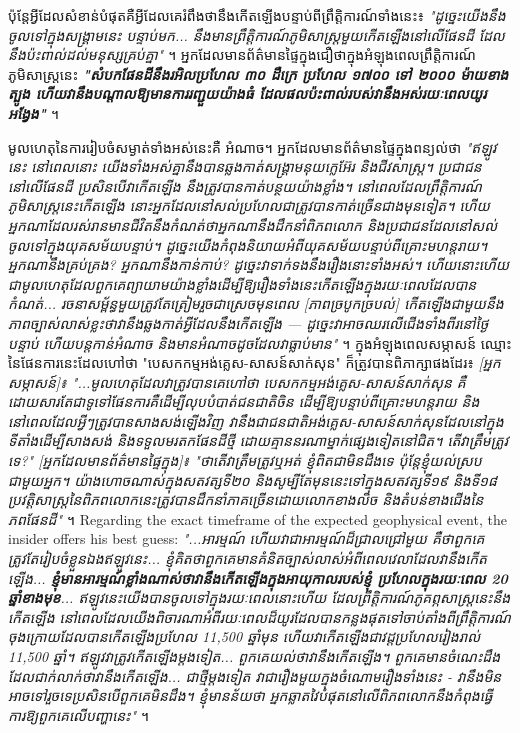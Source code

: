 \documentclass[10pt,twocolumn,letterpaper]{article}
\begin{document}
ប៉ុន្តែអ្វីដែលសំខាន់បំផុតគឺអ្វីដែលគេរំពឹងថានឹងកើតឡើងបន្ទាប់ពីព្រឹត្តិការណ៍ទាំងនេះ៖ \textit{"ដូច្នេះយើងនឹងចូលទៅក្នុងសង្គ្រាមនេះ បន្ទាប់មក... នឹងមានព្រឹត្តិការណ៍ភូមិសាស្ត្រមួយកើតឡើងនៅលើផែនដី ដែលនឹងប៉ះពាល់ដល់មនុស្សគ្រប់គ្នា"} \cite{4}។ អ្នកដែលមានព័ត៌មានផ្ទៃក្នុងជឿថាក្នុងអំឡុងពេលព្រឹត្តិការណ៍ភូមិសាស្ត្រនេះ \textit{\textbf{"សំបកផែនដីនឹងរអិលប្រហែល ៣០ ដឺក្រេ ប្រហែល ១៧០០ ទៅ ២០០០ ម៉ាយខាងត្បូង ហើយវានឹងបណ្តាលឱ្យមានការរញ្ជួយយ៉ាងធំ ដែលផលប៉ះពាល់របស់វានឹងអស់រយៈពេលយូរអង្វែង"  }} \cite{4}។

មូលហេតុនៃការរៀបចំសម្ងាត់ទាំងអស់នេះគឺ អំណាច។ អ្នកដែលមានព័ត៌មានផ្ទៃក្នុងពន្យល់ថា \textit{"ឥឡូវនេះ នៅពេលនោះ យើងទាំងអស់គ្នានឹងបានឆ្លងកាត់សង្គ្រាមនុយក្លេអ៊ែរ និងជីវសាស្ត្រ។ ប្រជាជននៅលើផែនដី ប្រសិនបើវាកើតឡើង នឹងត្រូវបានកាត់បន្ថយយ៉ាងខ្លាំង។ នៅពេលដែលព្រឹត្តិការណ៍ភូមិសាស្ត្រនេះកើតឡើង នោះអ្នកដែលនៅសល់ប្រហែលជាត្រូវបានកាត់ច្រើនជាងមុនទៀត។ ហើយអ្នកណាដែលរស់រានមានជីវិតនឹងកំណត់ថាអ្នកណានឹងដឹកនាំពិភពលោក និងប្រជាជនដែលនៅសល់ចូលទៅក្នុងយុគសម័យបន្ទាប់។ ដូច្នេះយើងកំពុងនិយាយអំពីយុគសម័យបន្ទាប់ពីគ្រោះមហន្តរាយ។ អ្នកណានឹងគ្រប់គ្រង? អ្នកណានឹងកាន់កាប់? ដូច្នេះវាទាក់ទងនឹងរឿងនោះទាំងអស់។ ហើយនោះហើយជាមូលហេតុដែលពួកគេព្យាយាមយ៉ាងខ្លាំងដើម្បីឱ្យរឿងទាំងនេះកើតឡើងក្នុងរយៈពេលដែលបានកំណត់... រចនាសម្ព័ន្ធមួយត្រូវតែត្រៀមរួចជាស្រេចមុនពេល [ភាពច្របូកច្របល់] កើតឡើងជាមួយនឹងភាពច្បាស់លាស់ខ្លះថាវានឹងឆ្លងកាត់អ្វីដែលនឹងកើតឡើង — ដូច្នេះវាអាចឈរលើជើងទាំងពីរនៅថ្ងៃបន្ទាប់ ហើយបន្តកាន់អំណាច និងមានអំណាចដូចដែលវាធ្លាប់មាន"} \cite{4}។ ក្នុងអំឡុងពេលសម្ភាសន៍ ឈ្មោះនៃផែនការនេះដែលហៅថា "បេសកកម្មអង់គ្លេស-សាសន៍សាក់សុន" ក៏ត្រូវបានពិភាក្សាផងដែរ៖ \textit{[អ្នកសម្ភាសន៍]៖ "...មូលហេតុដែលវាត្រូវបានគេហៅថា បេសកកម្មអង់គ្លេស-សាសន៍សាក់សុន គឺដោយសារតែជាទូទៅផែនការគឺដើម្បីលុបបំបាត់ជនជាតិចិន ដើម្បីឱ្យបន្ទាប់ពីគ្រោះមហន្តរាយ និងនៅពេលដែលអ្វីៗត្រូវបានសាងសង់ឡើងវិញ វានឹងជាជនជាតិអង់គ្លេស-សាសន៍សាក់សុនដែលនៅក្នុងទីតាំងដើម្បីសាងសង់ និងទទួលមរតកផែនដីថ្មី ដោយគ្មាននរណាម្នាក់ផ្សេងទៀតនៅជិត។ តើវាត្រឹមត្រូវទេ?" [អ្នកដែលមានព័ត៌មានផ្ទៃក្នុង]៖ "ថាតើវាត្រឹមត្រូវឬអត់ ខ្ញុំពិតជាមិនដឹងទេ ប៉ុន្តែខ្ញុំយល់ស្របជាមួយអ្នក។ យ៉ាងហោចណាស់ក្នុងសតវត្សទី២០ និងសូម្បីតែមុននេះទៅក្នុងសតវត្សទី១៩ និងទី១៨ ប្រវត្តិសាស្ត្រនៃពិភពលោកនេះត្រូវបានដឹកនាំភាគច្រើនដោយលោកខាងលិច និងតំបន់ខាងជើងនៃភពផែនដី"} \cite{4}។
Regarding the exact timeframe of the expected geophysical event, the insider offers his best guess: \textit{"...អារម្មណ៍ ហើយវាជាអារម្មណ៍ដ៏ជ្រាលជ្រៅមួយ គឺថាពួកគេត្រូវតែរៀបចំខ្លួនឯងឥឡូវនេះ... ខ្ញុំគិតថាពួកគេមានគំនិតច្បាស់លាស់អំពីពេលវេលាដែលវានឹងកើតឡើង... \textbf{ខ្ញុំមានអារម្មណ៍ខ្លាំងណាស់ថាវានឹងកើតឡើងក្នុងអាយុកាលរបស់ខ្ញុំ ប្រហែលក្នុងរយៈពេល 20 ឆ្នាំខាងមុខ}... ឥឡូវនេះយើងបានចូលទៅក្នុងរយៈពេលនោះហើយ ដែលព្រឹត្តិការណ៍ភូគព្ភសាស្ត្រនេះនឹងកើតឡើង នៅពេលដែលយើងពិចារណាអំពីរយៈពេលដ៏យូរដែលបានកន្លងផុតទៅចាប់តាំងពីព្រឹត្តិការណ៍ចុងក្រោយដែលបានកើតឡើងប្រហែល 11,500 ឆ្នាំមុន ហើយវាកើតឡើងជាវដ្តប្រហែលរៀងរាល់ 11,500 ឆ្នាំ។ ឥឡូវវាត្រូវកើតឡើងម្តងទៀត... ពួកគេយល់ថាវានឹងកើតឡើង។ ពួកគេមានចំណេះដឹងដែលជាក់លាក់ថាវានឹងកើតឡើង... ជាថ្មីម្តងទៀត វាជារឿងមួយក្នុងចំណោមរឿងទាំងនេះ - វានឹងមិនអាចទៅរួចទេប្រសិនបើពួកគេមិនដឹង។ ខ្ញុំមានន័យថា អ្នកឆ្លាតវៃបំផុតនៅលើពិភពលោកនឹងកំពុងធ្វើការឱ្យពួកគេលើបញ្ហានេះ"} \cite{4}។
\end{document}
